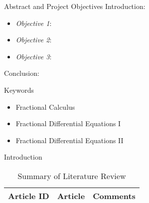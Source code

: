 


\setlength{\belowcaptionskip}{2ex}
\setlength\belowdisplayshortskip{2ex}
\begin{frame}[t]
\begin{columns}[t]
\begin{column}{\onecolwid} %
\begin{alertblock}{Abstract and Project Objectives}
Introduction:
\begin{itemize}
\item \textit{Objective 1}: 
\item \textit{Objective 2}: 
\item \textit{Objective 3}: 
\end{itemize}
Conclusion:
\end{alertblock}
\begin{block}{Keywords}
\begin{itemize}
\item Fractional Calculus
\item Fractional Differential Equations I
\item Fractional Differential Equations II
\end{itemize}	
\end{block}
\begin{alertblock}{Introduction}

\begin{table}[H]
	\centering
	\begin{tabular}{r|p{12cm}|l}
	\hline
	Article ID  & Article & Comments \\
	\hline
	\hline
	\end{tabular}
	\caption{Summary of Literature Review}
\end{table} 


\end{alertblock}
\end{column}
\end{columns}
\end{frame}
